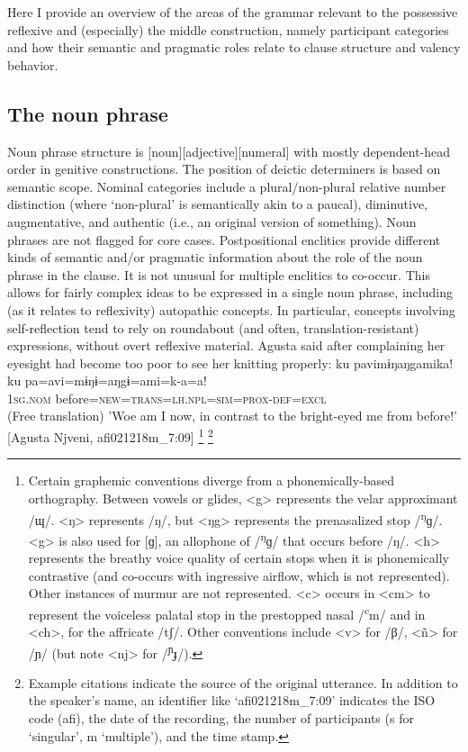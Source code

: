 \documentclass[output=paper]{langscibook}
\begin{document}
Here I provide an overview of the areas of the grammar relevant to the possessive reflexive and (especially) the middle construction, namely participant categories and how their semantic and pragmatic roles relate to clause structure and valency behavior. 

\subsection{{The} {noun} {phrase}}\label{sec:brooks:2.1}

Noun phrase structure is [noun][adjective][numeral] with mostly dependent-head order in genitive constructions. The position of deictic determiners is based on semantic scope. Nominal categories include a plural/non-plural relative number distinction (where ‘non-plural’ is semantically akin to a paucal), diminutive, augmentative, and authentic (i.e., an original version of something). Noun phrases are not flagged for core cases. Postpositional enclitics provide different kinds of semantic and/or pragmatic information about the role of the noun phrase in the clause. It is not unusual for multiple enclitics to co-occur. This allows for fairly complex ideas to be expressed in a single noun phrase, including (as it relates to reflexivity) autopathic concepts. In particular, concepts involving self-reflection tend to rely on roundabout (and often, translation-resistant) expressions, without overt reflexive material. Agusta said  after complaining her eyesight had become too poor to see her knitting properly:
\ea\label{ex:brooks:1}
\glll ku   pavimɨŋaŋgamika!\\
ku  pa=avi=mɨŋɨ=aŋgɨ=ami=k-a=a!\\
\textsc{1sg.nom}  before=\textsc{new=trans=lh.npl=sim=prox-def=excl}\\
\glt (Free translation) 'Woe am I now, in contrast to the bright-eyed me from before!'
{}[Agusta Njveni, afi021218m\_7:09]
\footnote{Certain graphemic conventions diverge from a phonemically-based orthography. Between vowels or glides, <g> represents the velar approximant /ɰ/. <ŋ> represents /ŋ/, but <ŋg> represents the prenasalized stop /\textsuperscript{ŋ}ɡ/. <g> is also used for [ɡ], an allophone of /\textsuperscript{ŋ}ɡ/ that occurs before /ŋ/. <h> represents the breathy voice quality of certain stops when it is phonemically contrastive (and co-occurs with ingressive airflow, which is not represented). Other instances of murmur are not represented. <c> occurs in <cm> to represent the voiceless palatal stop in the prestopped nasal /\textsuperscript{c}m/ and in <ch>, for the affricate /tʃ/. Other conventions include <v> for /β/, <ñ> for /ɲ/ (but note <nj> for /\textsuperscript{ɲ}ɟ/).}
\footnote{Example citations indicate the source of the original utterance. In addition to the speaker’s name, an identifier like ‘afi021218m\_7:09’ indicates the ISO code (afi), the date of the recording, the number of participants (s for ‘singular’, m ‘multiple’), and the time stamp.}
\z
\end{document}
